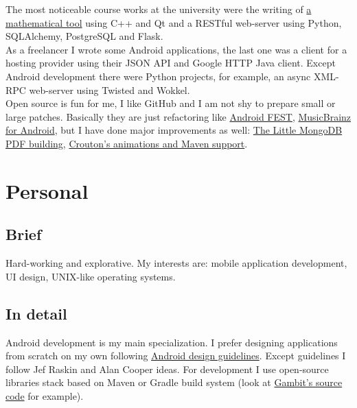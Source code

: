       The most noticeable course works at the university were the writing of
      \href{https://github.com/ming13/aequatio}{a mathematical tool}
      using C++ and Qt and a RESTful web-server using Python,
      SQLAlchemy, PostgreSQL and Flask. \\

      As a freelancer I wrote some Android applications, the last one was
      a client for a hosting provider using their JSON API
      and Google HTTP Java client.
      Except Android development there were Python projects, for example,
      an async XML-RPC web-server using Twisted and Wokkel. \\

      Open source is fun for me, I like GitHub and I am not shy to prepare
      small or large patches. Basically they are just refactoring like
      \href{https://github.com/square/fest-android/commits?author=ming13}{Android FEST},
      \href{https://github.com/jdamcd/musicbrainz-android/commits?author=ming13}{MusicBrainz for Android},
      but I have done major improvements as well:
      \href{https://github.com/karlseguin/the-little-mongodb-book/pull/16}{The Little MongoDB PDF building},
      \href{https://github.com/keyboardsurfer/Crouton/pulls/ming13?state=closed}{Crouton’s animations and Maven support}.


  \section*{Personal}

    \subsection*{Brief}

      Hard-working and explorative. My interests are:
      mobile application development, UI design, UNIX-like
      operating systems.

    \subsection*{In detail}

      Android development is my main specialization. I prefer designing
      applications from scratch on my own following
      \href{https://developer.android.com/design/}{Android design guidelines}.
      Except guidelines I follow Jef Raskin
      and Alan Cooper ideas. For development I use open-source libraries
      stack based on Maven or Gradle build system (look at
      \href{https://github.com/ming13/gambit}{Gambit’s source code} for example). \\

